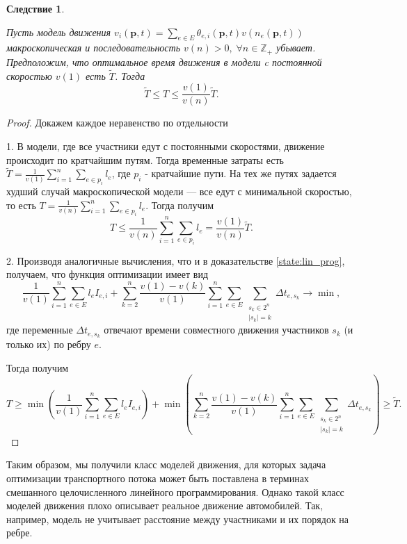 \documentclass[12pt, a4paper]{article}
\DeclareMathOperator*{\minn}{min}
\newtheorem{corollary}{Следствие}[section]
\begin{document}
\begin{corollary}
	\label{corollary:rel}

	Пусть модель движения $ v_i(\textbf{p}, t) = \sum \limits _{e \in E} \theta_{e, i} (\textbf{p}, t) v (n_e (\textbf{p}, t))$ макроскопическая и последовательность $v(n) > 0, \; \forall n \in \mathbb{Z}_+$ убывает. Предположим, что оптимальное время движения в модели c постоянной скоростью $v(1)$ есть $\widetilde{T}$. Тогда
	$$ \widetilde{T} \le T \le \frac {v(1)}{v(n)} \widetilde{T}.$$
	
\end{corollary}

\begin{proof}
	Докажем каждое неравенство по отдельности
	
	1. В модели, где все участники едут с постоянными скоростями, движение происходит по кратчайшим путям. Тогда временные затраты есть $\widetilde{T} = \frac{1}{v(1)} \sum \limits _{i = 1} ^ n \sum\limits_{e \in p_i} l_e$, где $p_i$ - кратчайшие пути.
	На тех же путях задается худший случай макроскопической модели --- все едут с минимальной скоростью, то есть $ T = \frac{1}{v(n)} \sum \limits _{i = 1} ^ n \sum\limits_{e \in p_i} l_e$. Тогда получим
	$$T \le  \frac{1}{v(n)} \sum \limits _{i = 1} ^ n \sum\limits_{e \in p_i} l_e = \frac {v(1)}{v(n)} \widetilde{T}.$$
	
	2. Производя аналогичные вычисления, что и в доказательстве \ref{state:lin_prog}, получаем, что функция оптимизации имеет вид
	$$ \frac{1}{v (1)} \sum\limits_{i = 1}^n \sum \limits _{e \in E} l_e I_{e, i} +  \sum\limits_{k = 2}^{n} \frac{v(1) - v(k)}{v (1)}  \sum\limits_{i = 1}^n \sum \limits _{e \in E} \sum\limits _{\substack{ s_k \in 2^n \\ |s_k| = k}}  \Delta t_{e, s_k} \rightarrow \minn ,$$
	где переменные $\Delta t_{e, s_k}$ отвечают времени совместного движения участников $s_k$  (и только их) по ребру $e$.
	
	Тогда получим
		$$T \ge 
		  \minn \left(  \frac{1}{v (1)} \sum\limits_{i = 1}^n \sum \limits _{e \in E} l_e I_{e, i} \right) 
		+ \minn \left(  \sum\limits_{k = 2}^{n} \frac{v(1) - v(k)}{v (1)}  \sum\limits_{i = 1}^n \sum \limits _{e \in E} \sum\limits _{\substack{ s_k \in 2^n \\ |s_k| = k}}  \Delta t_{e, s_k} \right) \ge \widetilde{T}.$$

\end{proof}

Таким образом, мы получили класс моделей движения, для которых задача оптимизации транспортного потока может быть поставлена в терминах смешанного целочисленного линейного программирования. Однако такой класс моделей движения плохо описывает реальное движение автомобилей. Так, например, модель не учитывает расстояние между участниками и их порядок на ребре.
\end{document}
